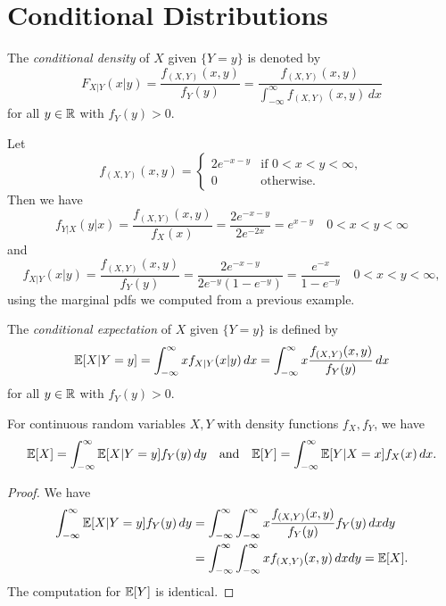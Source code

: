 \section{Conditional Distributions}

\begin{definition}
  The \emph{conditional density} of $X$ given
  $\{Y = y\}$ is denoted by
  \[
    F_{X | Y}(x | y) = \frac{f_{(X, Y)}(x, y)}{f_Y(y)}
    = \frac{f_{(X, Y)}(x, y)}{\displaystyle \int_{-\infty}^\infty f_{(X, Y)}(x, y) \, dx}
  \]
   for all $y \in \mathbb{R}$ with $f_Y(y) > 0$.
\end{definition}

\begin{example}
  Let
  \[
    f_{(X, Y)}(x, y) =
    \begin{cases}
      2e^{-x - y} & \text{if $0 < x < y < \infty$}, \\
      0 & \text{otherwise}.
    \end{cases}
  \]
  Then we have
  \[
    f_{Y | X}(y | x)
    = \frac{f_{(X, Y)}(x, y)}{f_X(x)}
    = \frac{2e^{-x - y}}{2e^{-2x}} = e^{x - y}
    \quad \text{$0 < x < y < \infty$}
  \]
  and
  \[
    f_{X | Y}(x | y) = \frac{f_{(X, Y)}(x, y)}{f_Y(y)}
    = \frac{2e^{-x - y}}{2e^{-y}(1 - e^{-y})}
    = \frac{e^{-x}}{1 - e^{-y}} \quad \text{$0 < x < y < \infty$},
  \]
  using the marginal pdfs we computed from a previous
  example.
\end{example}

\begin{definition}
  The \emph{conditional expectation} of $X$ given
  $\{Y = y\}$ is defined by
  \[
    \mathbb{E}[X | Y = y]
    = \int_{-\infty}^\infty x f_{X | Y}(x | y) \, dx
    = \int_{-\infty}^\infty x \frac{f_{(X, Y)}(x, y)}{f_Y(y)} \, dx
  \]
  for all $y \in \mathbb{R}$ with $f_Y(y) > 0$.
\end{definition}

\begin{prop}
  For continuous random variables $X, Y$ with
  density functions $f_X, f_Y$, we have
  \[
    \mathbb{E}[X] =
    \int_{-\infty}^\infty \mathbb{E}[X | Y = y] f_Y(y) \, dy
    \quad \text{and} \quad
    \mathbb{E}[Y] =
    \int_{-\infty}^\infty \mathbb{E}[Y | X = x] f_X(x) \, dx.
  \]
\end{prop}

\begin{proof}
  We have
  \begin{align*}
    \int_{-\infty}^\infty \mathbb{E}[X | Y = y] f_Y(y) \, dy
    &= \int_{-\infty}^\infty \int_{-\infty}^\infty x \frac{f_{(X, Y)}(x, y)}{f_Y(y)} f_Y(y) \, dx dy \\
    &= \int_{-\infty}^\infty \int_{-\infty}^\infty x f_{(X, Y)}(x, y) \, dx dy = \mathbb{E}[X].
  \end{align*}
  The computation for $\mathbb{E}[Y]$ is identical.
\end{proof}

